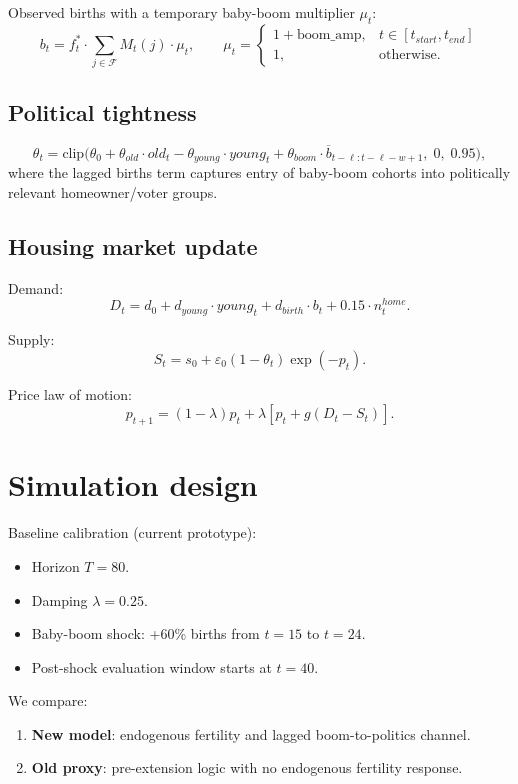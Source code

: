 \documentclass[11pt]{article}
\begin{document}
Observed births with a temporary baby-boom multiplier $\mu_t$:
\[
b_t = f_t^* \cdot \sum_{j \in \mathcal{F}} M_t(j) \cdot \mu_t,\qquad
\mu_t =
\begin{cases}
1+\text{boom\_amp}, & t \in [t_{start}, t_{end}]\\
1, & \text{otherwise}.
\end{cases}
\]

\subsection{Political tightness}

\[
\theta_t = \text{clip}\Big(
\theta_0
 + \theta_{old}\cdot old_t
 - \theta_{young}\cdot young_t
 + \theta_{boom}\cdot \overline{b}_{t-\ell:t-\ell-w+1},\;
0,\;0.95
\Big),
\]
where the lagged births term captures entry of baby-boom cohorts into politically relevant
homeowner/voter groups.

\subsection{Housing market update}

Demand:
\[
D_t = d_0 + d_{young}\cdot young_t + d_{birth}\cdot b_t + 0.15\cdot n^{home}_t.
\]

Supply:
\[
S_t = s_0 + \varepsilon_0(1-\theta_t)\exp(-p_t).
\]

Price law of motion:
\[
p_{t+1} = (1-\lambda)p_t + \lambda\left[p_t + g(D_t-S_t)\right].
\]

\section{Simulation design}

Baseline calibration (current prototype):
\begin{itemize}
\item Horizon $T=80$.
\item Damping $\lambda = 0.25$.
\item Baby-boom shock: +60\% births from $t=15$ to $t=24$.
\item Post-shock evaluation window starts at $t=40$.
\end{itemize}

We compare:
\begin{enumerate}
\item \textbf{New model}: endogenous fertility and lagged boom-to-politics channel.
\item \textbf{Old proxy}: pre-extension logic with no endogenous fertility response.
\end{enumerate}
\end{document}
